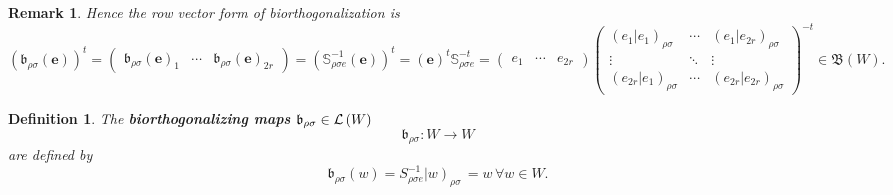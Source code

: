 \documentclass[aps,preprint]{revtex4}
\newtheorem{definition}[theorem]{Definition}
\newtheorem{remark}[theorem]{Remark}
\begin{document}
\begin{remark}
Hence the row vector form of biorthogonalization is 
\begin{equation}
\left( \overset{}{\mathfrak{b}_{\rho \sigma }\left( \boldsymbol{e}\right) }%
\right) ^{t}=\left( 
\begin{array}{ccc}
\mathfrak{b}_{\rho \sigma }\left( \boldsymbol{e}\right) _{1} & \cdots & 
\mathfrak{b}_{\rho \sigma }\left( \boldsymbol{e}\right) _{2r}%
\end{array}%
\right) =\left( \mathbb{S}_{\rho \sigma e}^{-1}\left( \mathbf{e}\right)
\right) ^{t}=\left( \mathbf{e}\right) ^{t}\mathbb{S}_{\rho \sigma
e}^{-t}=\left( 
\begin{array}{ccc}
e_{1} & \cdots & e_{2r}%
\end{array}%
\right) \left( 
\begin{array}{ccc}
\left( \left. e_{1}\right\vert e_{1}\right) _{\rho \sigma } & \cdots & 
\left( \left. e_{1}\right\vert e_{2r}\right) _{\rho \sigma } \\ 
\vdots & \ddots & \vdots \\ 
\left( \left. e_{2r}\right\vert e_{1}\right) _{\rho \sigma } & \cdots & 
\left( \left. e_{2r}\right\vert e_{2r}\right) _{\rho \sigma }%
\end{array}%
\right) ^{-t}\in \mathfrak{B}\left( W\right) .
\end{equation}
\end{remark}

\begin{definition}
The \textbf{biorthogonalizing maps \label{biorthogonalizing map} }$\mathfrak{%
b}_{\rho \sigma }\in \mathcal{L}\left( W\right) $ 
\begin{equation}
\mathfrak{b}_{\rho \sigma }:W\rightarrow W
\end{equation}%
are defined by 
\begin{equation}
\mathfrak{b}_{\rho \sigma }\left( w\right) =S_{\rho \sigma e}^{-1}\left\vert
w\right) _{\rho \sigma }\,=w\,\forall w\in W.
\end{equation}
\end{definition}
\end{document}
